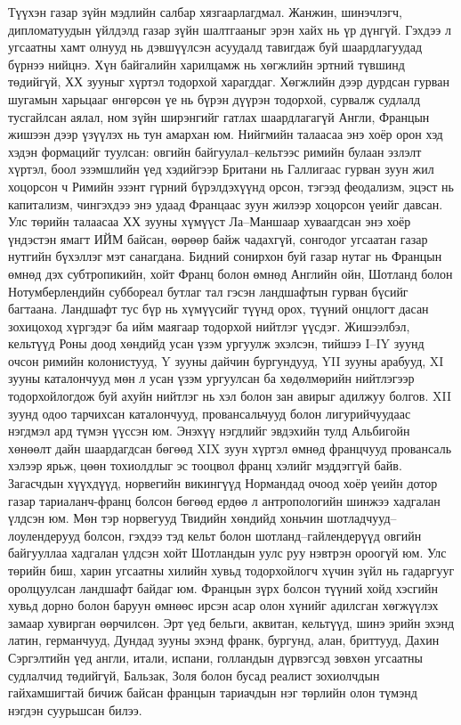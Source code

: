 Түүхэн газар зүйн мэдлийн салбар хязгаарлагдмал. Жанжин, шинэчлэгч, дипломатуудын үйлдэлд газар зүйн шалтгааныг эрэн хайх нь үр дүнгүй. Гэхдээ л угсаатны хамт олнууд нь дэвшүүлсэн асуудалд тавигдаж буй шаардлагуудад бүрнээ нийцнэ. Хүн байгалийн харилцамж нь хөгжлийн эртний түвшинд төдийгүй, ХХ зууныг хүртэл тодорхой харагддаг.
Хөгжлийн дээр дурдсан гурван шугамын харьцааг өнгөрсөн үе нь бүрэн дүүрэн тодорхой, сурвалж судлалд тусгайлсан аялал, ном зүйн ширэнгийг гатлах шаардлагагүй Англи, Францын жишээн дээр үзүүлэх нь тун амархан юм. Нийгмийн талаасаа энэ хоёр орон хэд хэдэн формацийг туулсан: овгийн байгуулал–кельтээс римийн булаан эзлэлт хүртэл, боол эзэмшлийн үед хэдийгээр Британи нь Галлигаас гурван зуун жил хоцорсон ч Римийн эзэнт гүрний бүрэлдэхүүнд орсон, тэгээд феодализм, эцэст нь капитализм, чингэхдээ энэ удаад Францаас зуун жилээр хоцорсон үеийг давсан. Улс төрийн талаасаа ХХ зууны хүмүүст Ла–Маншаар хуваагдсан энэ хоёр үндэстэн ямагт ИЙМ байсан, өөрөөр байж чадахгүй, сонгодог угсаатан газар нутгийн бүхэллэг мэт санагдана.
Бидний сонирхон буй газар нутаг нь Францын өмнөд дэх субтропикийн, хойт Франц болон өмнөд Английн ойн, Шотланд болон Нотумберлендийн суббореал бутлаг тал гэсэн ландшафтын гурван бүсийг багтаана. Ландшафт тус бүр нь хүмүүсийг түүнд орох, түүний онцлогт дасан зохицоход хүргэдэг ба ийм маягаар тодорхой нийтлэг үүсдэг. Жишээлбэл, кельтүүд Роны доод хөндийд усан үзэм ургуулж эхэлсэн, тийшээ I–IY зуунд очсон римийн колонистууд, Y зууны дайчин бургундууд, YII зууны арабууд, XI зууны каталончууд мөн л усан үзэм ургуулсан ба хөдөлмөрийн нийтлэгээр тодорхойлогдож буй ахуйн нийтлэг нь хэл болон зан авирыг адилжуу болгов. XII зуунд одоо тарчихсан каталончууд, провансальчууд болон лигурийчуудаас нэгдмэл ард түмэн үүссэн юм. Энэхүү нэгдлийг эвдэхийн тулд Альбигойн хөнөөлт дайн шаардагдсан бөгөөд XIX зуун хүртэл өмнөд францчууд провансаль хэлээр ярьж, цөөн тохиолдлыг эс тооцвол франц хэлийг мэддэггүй байв.
Загасчдын хүүхдүүд, норвегийн викингүүд Нормандад очоод хоёр үеийн дотор газар тариаланч-франц болсон бөгөөд ердөө л антропологийн шинжээ хадгалан үлдсэн юм. Мөн тэр норвегууд Твидийн хөндийд хоньчин шотладчууд– лоулендерууд болсон, гэхдээ тэд кельт болон шотланд–гайлендерүүд овгийн байгууллаа хадгалан үлдсэн хойт Шотландын уулс руу нэвтрэн ороогүй юм. Улс төрийн биш, харин угсаатны хилийн хувьд тодорхойлогч хүчин зүйл нь гадаргууг оролцуулсан ландшафт байдаг юм.
Францын зүрх болсон түүний хойд хэсгийн хувьд дорно болон баруун өмнөөс ирсэн асар олон хүнийг адилсган хөгжүүлэх замаар хувирган өөрчилсөн. Эрт үед бельги, аквитан, кельтүүд, шинэ эрийн эхэнд латин, германчууд, Дундад зууны эхэнд франк, бургунд, алан, бриттууд, Дахин Сэргэлтийн үед англи, итали, испани, голландын дүрвэгсэд зөвхөн угсаатны судлалчид төдийгүй, Бальзак, Золя болон бусад реалист зохиолчдын гайхамшигтай бичиж байсан францын тариачдын нэг төрлийн олон түмэнд нэгдэн суурьшсан билээ.
